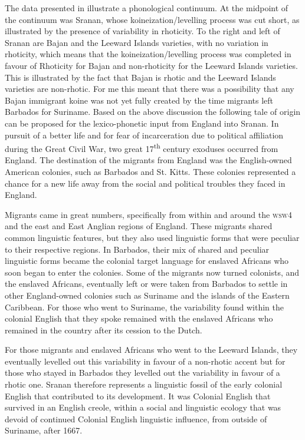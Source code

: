 The data presented in  illustrate a phonological continuum. At the midpoint of the continuum was Sranan, whose koineization/levelling process was cut short, as illustrated by the presence of variability in rhoticity. To the right and left of Sranan are Bajan and the Leeward Islands varieties, with no variation in rhoticity, which means that the koineization/levelling process was completed in favour of Rhoticity for Bajan and non-rhoticity for the Leeward Islands varieties. This is illustrated by the fact that Bajan is rhotic and the Leeward Islands varieties are non-rhotic. For me this meant that there was a possibility that any Bajan immigrant koine was not yet fully created by the time migrants left Barbados for Suriname. Based on the above discussion the following tale of origin can be proposed for the lexico-phonetic input from England into Sranan. In pursuit of a better life and for fear of incarceration due to political affiliation during the Great Civil War, two great 17\textsuperscript{th} century exoduses occurred from England. The destination of the migrants from England was the English-owned American colonies, such as Barbados and St. Kitts. These colonies represented a chance for a new life away from the social and political troubles they faced in England.

Migrants came in great numbers, specifically from within and around the \textsc{wsw4} and the east and East Anglian regions of England. These migrants shared common linguistic features, but they also used linguistic forms that were peculiar to their respective regions. In Barbados, their mix of shared and peculiar linguistic forms became the colonial target language for enslaved Africans who soon began to enter the colonies. Some of the migrants now turned colonists, and the enslaved Africans, eventually left or were taken from Barbados to settle in other England-owned colonies such as Suriname and the islands of the Eastern Caribbean. For those who went to Suriname, the variability found within the colonial English that they spoke remained with the enslaved Africans who remained in the country after its cession to the Dutch.

For those migrants and enslaved Africans who went to the Leeward Islands, they eventually levelled out this variability in favour of a non-rhotic accent but for those who stayed in Barbados they levelled out the variability in favour of a rhotic one. Sranan therefore represents a linguistic fossil of the early colonial English that contributed to its development. It was Colonial English that survived in an English creole, within a social and linguistic ecology that was devoid of continued Colonial English linguistic influence, from outside of Suriname, after 1667.


